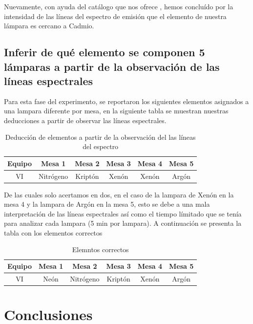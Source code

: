 \documentclass[article,12pt]{elsarticle}
\begin{document}
Nuevamente, con ayuda del catálogo que nos ofrece \cite{link_adicional}, hemos concluído por la intensidad de las líneas del espectro de emisión que el elemento de nuestra lámpara es cercano a Cadmio.

\subsection{Inferir de qué elemento se componen 5 lámparas a partir de la observación de las líneas espectrales}

Para esta fase del experimento, se reportaron los siguientes elementos asignados a una lampara diferente por mesa, en la siguiente tabla se muestran nuestras deducciones a partir de observar las líneas espectrales.

\begin{table}[H]
\centering
\begin{tabular}{|c|c|c|c|c|c|}
\hline
Equipo & Mesa 1 & Mesa 2 & Mesa 3 & Mesa 4 & Mesa 5 \\
\hline
VI & Nitrógeno & Kriptón & Xenón & Xenón & Argón \\
\hline
\end{tabular}
\caption{Deducción de elementos a partir de la observación del las líneas del espectro}
\end{table}

De las cuales solo acertamos en dos, en el caso de la lampara de Xenón en la mesa 4 y la lampara de Argón en la mesa 5, esto se debe a una mala interpretación de las líneas espectrales así como el tiempo límitado que se tenía para analizar cada lampara (5 min por lampara). A continuación se presenta la tabla con los elementos correctos

\begin{table}[H]
\centering
\begin{tabular}{|c|c|c|c|c|c|}
\hline
Equipo & Mesa 1 & Mesa 2 & Mesa 3 & Mesa 4 & Mesa 5 \\
\hline
VI & Neón & Nitrógeno & Kriptón & Xenón & Argón \\
\hline
\end{tabular}
\caption{Elemntos correctos}
\end{table}



\section{Conclusiones}
\end{document}
